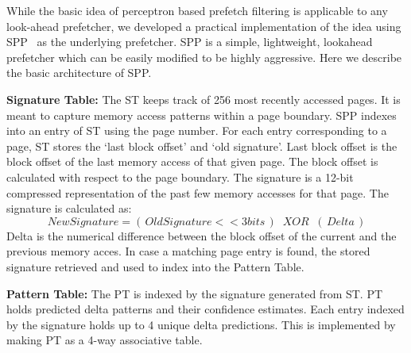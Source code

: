 While the basic idea of perceptron based prefetch filtering is applicable 
to any look-ahead prefetcher, we developed a practical implementation 
of the idea using SPP~\cite{SPP} as the underlying prefetcher. 
SPP is a simple, lightweight, lookahead prefetcher which can be easily 
modified to be highly aggressive.  
Here we describe the basic architecture of SPP.

\textbf{Signature Table:} The ST keeps track of 256 most recently accessed
pages.  It is meant to capture memory access patterns within a page
boundary.  SPP indexes into an entry of ST using the page number.  For
each entry corresponding to a page, ST stores the `last block offset'
and `old signature'.  Last block offset is the block offset of the
last memory access of that given page.  The block offset is calculated
with respect to the page boundary.  The signature is a 12-bit
compressed representation of the past few memory accesses for that
page.  The signature is calculated as:
$$New Signature = (\,Old Signature << 3 bits\,) \;\;XOR\;\; (\,Delta\,)$$ 
Delta is the numerical difference between the block offset of the 
current and the previous memory acces. In case a matching page entry 
is found, the stored signature retrieved and used to index into the 
Pattern Table.

\textbf{Pattern Table:} The PT is indexed by the signature generated
from ST.  PT holds predicted delta patterns and their confidence
estimates.  Each entry indexed by the signature holds up to 4 unique
delta predictions.  This is implemented by making PT as a 4-way
associative table.



